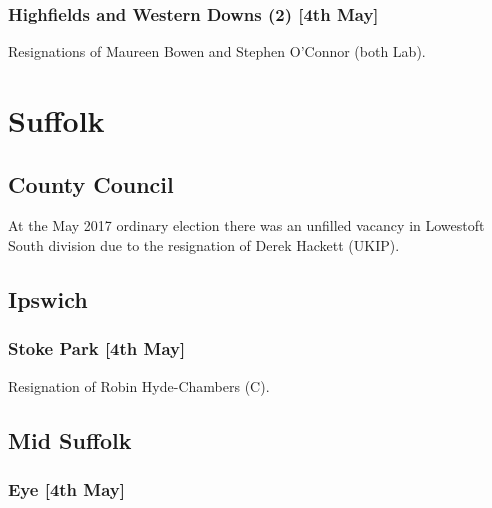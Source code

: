 \documentclass[a4paper,openany]{book}
\begin{document}
\begin{resultsiii}
\subsubsection*{Highfields and Western Downs (2) \hspace*{\fill}\nolinebreak[1]%
\enspace\hspace*{\fill}
[4th May]}


Resignations of Maureen Bowen and Stephen O'Connor (both Lab).

\section{Suffolk}

\subsection*{County Council}

At the May 2017 ordinary election there was an unfilled vacancy in Lowestoft South division due to the resignation of Derek Hackett (UKIP).

\subsection*{Ipswich}

\subsubsection*{Stoke Park \hspace*{\fill}\nolinebreak[1]%
\enspace\hspace*{\fill}
[4th May]}


Resignation of Robin Hyde-Chambers (C).

\subsection*{Mid Suffolk}

\subsubsection*{Eye \hspace*{\fill}\nolinebreak[1]%
\enspace\hspace*{\fill}
[4th May]}


\end{resultsiii}
\end{document}

